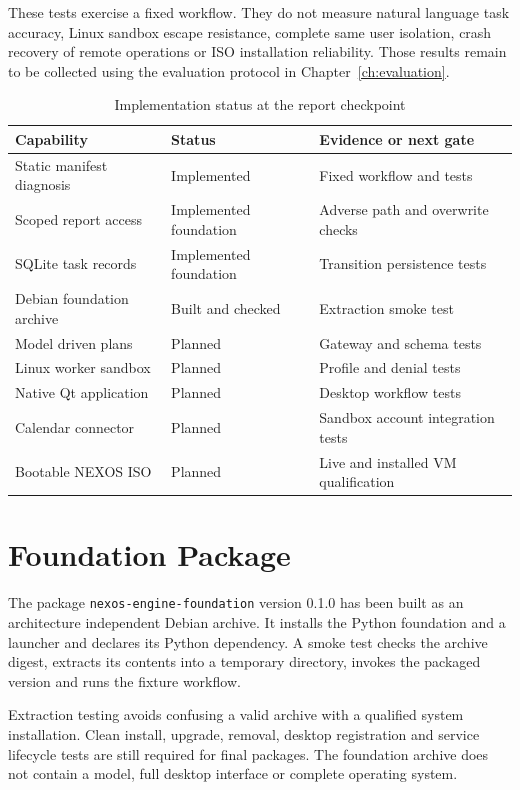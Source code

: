 These tests exercise a fixed workflow. They do not measure natural language task accuracy, Linux sandbox escape resistance, complete same user isolation, crash recovery of remote operations or ISO installation reliability. Those results remain to be collected using the evaluation protocol in Chapter~\ref{ch:evaluation}.

\begin{table}[htbp]\centering\small
\caption{Implementation status at the report checkpoint}
\begin{tabularx}{\textwidth}{Y P{31mm}Y}
\toprule\textbf{Capability} & \textbf{Status} & \textbf{Evidence or next gate}\\\midrule
Static manifest diagnosis & Implemented & Fixed workflow and tests\\
Scoped report access & Implemented foundation & Adverse path and overwrite checks\\
SQLite task records & Implemented foundation & Transition persistence tests\\
Debian foundation archive & Built and checked & Extraction smoke test\\
Model driven plans & Planned & Gateway and schema tests\\
Linux worker sandbox & Planned & Profile and denial tests\\
Native Qt application & Planned & Desktop workflow tests\\
Calendar connector & Planned & Sandbox account integration tests\\
Bootable NEXOS ISO & Planned & Live and installed VM qualification\\\bottomrule
\end{tabularx}\end{table}

\section{Foundation Package}
The package \texttt{nexos-engine-foundation} version 0.1.0 has been built as an architecture independent Debian archive. It installs the Python foundation and a launcher and declares its Python dependency. A smoke test checks the archive digest, extracts its contents into a temporary directory, invokes the packaged version and runs the fixture workflow.

Extraction testing avoids confusing a valid archive with a qualified system installation. Clean install, upgrade, removal, desktop registration and service lifecycle tests are still required for final packages. The foundation archive does not contain a model, full desktop interface or complete operating system.

